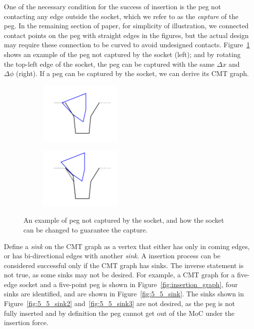 \documentclass[letterpaper, 10 pt, conference]{ieeeconf}
\begin{document}
One of the necessary condition for the success of insertion is the peg not contacting any edge outside the socket, which we refer to as the {\em capture} of the peg. In the remaining section of paper, for simplicity of illustration, we connected contact points on the peg with straight edges in the figures, but the actual design may require these connection to be curved to avoid undesigned contacts. Figure~\ref{fig:capture} shows an example of the peg not captured by the socket (left); and by rotating the top-left edge of the socket, the peg can be captured with the same $\Delta x$ and $\Delta\phi$ (right). If a peg can be captured by the socket, we can derive its CMT graph. 

\begin{figure}[t]
\begin{center}
\begin{subfigure}[t]{0.23\textwidth}
\begin{center}
\includegraphics[height=1.2in]{figures/not_capture.png}
\end{center}
\end{subfigure}
\begin{subfigure}[t]{0.23\textwidth}
\begin{center}
\includegraphics[height=1.2in]{figures/captured.png}
\end{center}
\end{subfigure}
\caption{An example of peg not captured by the socket, and how the socket can be changed to guarantee the capture. }
\label{fig:capture}
\end{center}
\end{figure}


Define a {\em sink} on the CMT graph as a vertex that either has only in coming edges, or has bi-directional edges with another {\em sink}. A insertion process can be considered successful only if the CMT graph has sinks. The inverse statement is not true, as some sinks may not be desired. For example, a CMT graph for a five-edge socket and a five-point peg is shown in Figure~\ref{fig:insertion_graph}, four sinks are identified, and are shown in Figure~\ref{fig:5_5_sink}. The sinks shown in Figure~\ref{fig:5_5_sink2} and~\ref{fig:5_5_sink3} are not desired, as the peg is not fully inserted and by definition the peg cannot get out of the MoC under the insertion force. 
\end{document}
